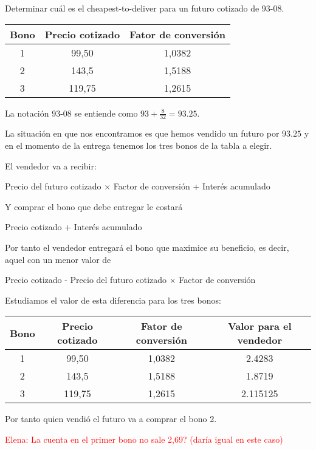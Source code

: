 \begin{problem}[2]
Determinar cuál es el cheapest-to-deliver para un futuro cotizado de 93-08.

\begin{center}
\begin{tabular}{|c|c|c|}
\hline
\textbf{Bono} & \textbf{Precio cotizado} & \textbf{Fator de conversión} \\
\hline
1 & 99,50 & 1,0382 \\
2 & 143,5 & 1,5188 \\
3 & 119,75 & 1,2615\\
\hline
\end{tabular}
\end{center}

\solution
{}

La notación 93-08 se entiende como $93 + \frac{8}{32} = 93.25$.

La situación en que nos encontramos es que hemos vendido un futuro por $93.25$ y en el momento de la entrega tenemos
los tres bonos de la tabla a elegir.

El vendedor va a recibir:
\begin{center}
Precio del futuro cotizado $\times$ Factor de conversión + Interés acumulado
\end{center}
Y comprar el bono que debe entregar le costará
\begin{center}
Precio cotizado + Interés acumulado
\end{center}

Por tanto el vendedor entregará el bono que maximice su beneficio, es decir, aquel con un menor valor de
\begin{center}
Precio cotizado - Precio del futuro cotizado $\times$ Factor de conversión
\end{center}

Estudiamos el valor de esta diferencia para los tres bonos:

\begin{center}
\begin{tabular}{|c|c|c|c|}
\hline
\textbf{Bono} & \textbf{Precio cotizado} & \textbf{Fator de conversión} & \textbf{Valor para el vendedor} \\
\hline
1 & 99,50 & 1,0382 & 2.4283 \\
2 & 143,5 & 1,5188 & 1.8719 \\
3 & 119,75 & 1,2615 & 2.115125\\
\hline
\end{tabular}
\end{center}

Por tanto quien vendió el futuro va a comprar el bono 2.

\textcolor{red}{Elena: La cuenta en el primer bono no sale 2,69? (daría igual en este caso)}
\end{problem}

